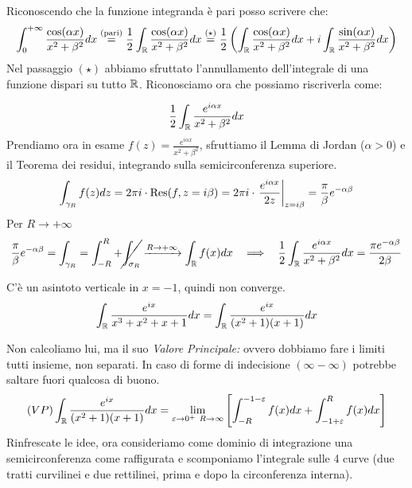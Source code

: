 Riconoscendo che la funzione integranda è pari posso scrivere che:
\begin{equation*}
\int^{+ \infty}_{0}\frac{\cos (\alpha x)}{x^{2} + \beta^{2}} dx\overset{\text{(pari)}}{=}\frac{1}{2}\int_{\mathbb{R}}\frac{\cos (\alpha x)}{x^{2} + \beta^{2}} dx\overset{(\star)}{=}\frac{1}{2}\left(\int_{\mathbb{R}}\frac{\cos (\alpha x)}{x^{2} + \beta^{2}} dx + i\int_{\mathbb{R}}\frac{\sin (\alpha x)}{x^{2} + \beta^{2}} dx\right)
\end{equation*}
Nel passaggio $(\star)$ abbiamo sfruttato l'annullamento dell'integrale di una funzione dispari su tutto $\mathbb{R} $. Riconosciamo ora che possiamo riscriverla come:

\begin{equation*}
\frac{1}{2}\int_{\mathbb{R}}\frac{e^{i\alpha x}}{x^{2} + \beta^{2}} dx
\end{equation*}Prendiamo ora in esame $f(z) = \frac{e^{i\alpha x}}{x^{2} + \beta^{2}}$, sfruttiamo il Lemma di Jordan ($\alpha > 0$) e il Teorema dei residui, integrando sulla semicirconferenza superiore.
\begin{equation*}
\int_{\gamma_{R}} f(z) dz = 2\pi i \cdot \operatorname{Res} (f, z = i\beta) = 2\pi i \cdot \left. \frac{e^{i\alpha x}}{2z}\right|_{z = i\beta} = \frac{\pi}{\beta} e^{- \alpha \beta}
\end{equation*}
Per $R\rightarrow + \infty $
\begin{equation*}
\frac{\pi}{\beta} e^{- \alpha \beta} = \int_{\gamma_{R}} = \int^{R}_{- R} + \cancel{\int_{\sigma_{R}}}\xrightarrow{R\rightarrow + \infty}\int_{\mathbb{R}} f(x) dx\ \ \implies \ \ \frac{1}{2}\int_{\mathbb{R}}\frac{e^{i\alpha x}}{x^{2} + \beta^{2}} dx = \frac{\pi e^{- \alpha \beta}}{2\beta}
\end{equation*}

\Soluzione

C'è un asintoto verticale in $x = -1$, quindi non converge.
\begin{equation*}
\int_{\mathbb{R}}\frac{e^{ix}}{x^{3} + x^{2} + x + 1} dx = \int_{\mathbb{R}}\frac{e^{ix}}{(x^{2} + 1)(x + 1)} dx
\end{equation*}

Non calcoliamo lui, ma il suo \textit{Valore Principale:} ovvero dobbiamo fare i limiti tutti insieme, non separati. In caso di forme di indecisione $(\infty - \infty)$ potrebbe saltare fuori qualcosa di buono.
\begin{equation*}
(VP)\int_{\mathbb{R}}\frac{e^{ix}}{(x^{2} + 1)(x + 1)} dx = \lim_{\varepsilon \rightarrow 0^{+} \ R\rightarrow \infty}\left[\int^{- 1 - \varepsilon}_{- R} f(x)dx + \int^{R}_{- 1 + \varepsilon} f(x)dx\right]
\end{equation*}
Rinfrescate le idee, ora consideriamo come dominio di integrazione una semicirconferenza come raffigurata e scomponiamo l'integrale sulle 4 curve (due tratti curvilinei e due rettilinei, prima e dopo la circonferenza interna).


